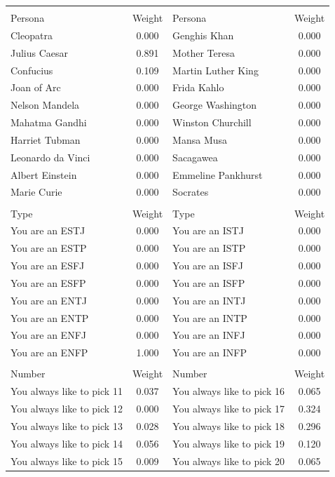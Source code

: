 \begin{tabular}{l cl c}
\hline \addlinespace[4pt]
\multicolumn{4}{c}{\textbf{Historical Figures}}\\\addlinespace[5pt]
\hline\addlinespace[4pt]
Persona & Weight & Persona & Weight \\
\hline\addlinespace[4pt]
Cleopatra & 0.000 & Genghis Khan & 0.000 \\
Julius Caesar & 0.891 & Mother Teresa & 0.000 \\
Confucius & 0.109 & Martin Luther King & 0.000 \\
Joan of Arc & 0.000 & Frida Kahlo & 0.000 \\
Nelson Mandela & 0.000 & George Washington & 0.000 \\
Mahatma Gandhi & 0.000 & Winston Churchill & 0.000 \\
Harriet Tubman & 0.000 & Mansa Musa & 0.000 \\
Leonardo da Vinci & 0.000 & Sacagawea & 0.000 \\
Albert Einstein & 0.000 & Emmeline Pankhurst & 0.000 \\
Marie Curie & 0.000 & Socrates & 0.000 \\
\hline\addlinespace[5pt]
\multicolumn{4}{c}{\textbf{MBTI Types}} \\\addlinespace[4pt]
\hline\addlinespace[4pt]
Type & Weight & Type & Weight \\
\hline\addlinespace[4pt]
You are an ESTJ  & 0.000 & You are an ISTJ  & 0.000 \\
You are an ESTP  & 0.000 & You are an ISTP  & 0.000 \\
You are an ESFJ  & 0.000 & You are an ISFJ  & 0.000 \\
You are an ESFP  & 0.000 & You are an ISFP  & 0.000 \\
You are an ENTJ  & 0.000 & You are an INTJ  & 0.000 \\
You are an ENTP  & 0.000 & You are an INTP  & 0.000 \\
You are an ENFJ  & 0.000 & You are an INFJ  & 0.000 \\
You are an ENFP  & 1.000 & You are an INFP  & 0.000 \\
\hline\addlinespace[5pt]
\multicolumn{4}{c}{\textbf{Always Pick `N`}} \\\addlinespace[4pt]
\hline\addlinespace[4pt]
Number & Weight & Number & Weight \\
\hline\addlinespace[4pt]
You always like to pick 11 & 0.037 & You always like to pick 16 & 0.065 \\
You always like to pick 12 & 0.000 & You always like to pick 17 & 0.324 \\
You always like to pick 13 & 0.028 & You always like to pick 18 & 0.296 \\
You always like to pick 14 & 0.056 & You always like to pick 19 & 0.120 \\
You always like to pick 15 & 0.009 & You always like to pick 20 & 0.065 \\
\hline
\end{tabular}
